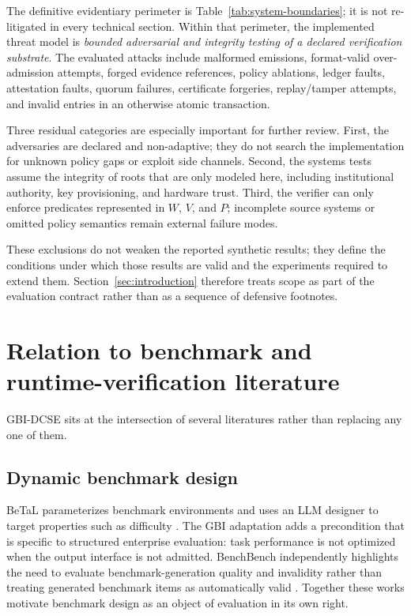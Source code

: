\documentclass[11pt]{article}
\begin{document}
The definitive evidentiary perimeter is Table~\ref{tab:system-boundaries}; it is not re-litigated in every technical section. Within that perimeter, the implemented threat model is \emph{bounded adversarial and integrity testing of a declared verification substrate}. The evaluated attacks include malformed emissions, format-valid over-admission attempts, forged evidence references, policy ablations, ledger faults, attestation faults, quorum failures, certificate forgeries, replay/tamper attempts, and invalid entries in an otherwise atomic transaction.

Three residual categories are especially important for further review. First, the adversaries are declared and non-adaptive; they do not search the implementation for unknown policy gaps or exploit side channels. Second, the systems tests assume the integrity of roots that are only modeled here, including institutional authority, key provisioning, and hardware trust. Third, the verifier can only enforce predicates represented in \(W\), \(V\), and \(P\); incomplete source systems or omitted policy semantics remain external failure modes.

These exclusions do not weaken the reported synthetic results; they define the conditions under which those results are valid and the experiments required to extend them. Section~\ref{sec:introduction} therefore treats scope as part of the evaluation contract rather than as a sequence of defensive footnotes.
\newpage

\section{Relation to benchmark and runtime-verification literature}

GBI-DCSE sits at the intersection of several literatures rather than replacing any one of them.

\subsection{Dynamic benchmark design}

BeTaL parameterizes benchmark environments and uses an LLM designer to target properties such as difficulty \cite{dsouza2025betal}. The GBI adaptation adds a precondition that is specific to structured enterprise evaluation: task performance is not optimized when the output interface is not admitted. BenchBench independently highlights the need to evaluate benchmark-generation quality and invalidity rather than treating generated benchmark items as automatically valid \cite{zheng2026benchbench}. Together these works motivate benchmark design as an object of evaluation in its own right.
\end{document}
